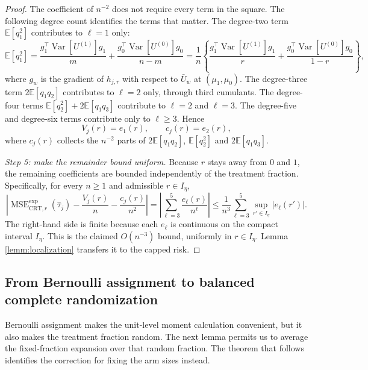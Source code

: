 \documentclass{article}
\newcommand{\EEE}{\mathbb{E}}
\newcommand{\Var}[1]{\operatorname{Var}\left[#1\right]}
\newcommand{\htau}{\hat{\tau}}
\DeclareMathOperator{\MSE}{MSE}
\newcommand{\CRT}{\mathrm{CRT}}
\newcommand{\MSEexp}{\MSE^{\mathrm{exp}}}
\theoremstyle{plain}
\theoremstyle{definition}
\theoremstyle{remark}
\begin{document}
\begin{proof}
The coefficient of $n^{-2}$ does not require every term in the square.
The following degree count identifies the terms that matter. The degree-two term $\EEE[q_1^2]$ contributes to $\ell=1$ only:
\[
\EEE[q_1^2]
=\frac{g_1^\top\Var{U^{(1)}}g_1}{m}+\frac{g_0^\top\Var{U^{(0)}}g_0}{n-m}
=\frac1n\left\{\frac{g_1^\top\Var{U^{(1)}}g_1}{r}+\frac{g_0^\top\Var{U^{(0)}}g_0}{1-r}\right\},
\]
where $g_w$ is the gradient of $h_{j,r}$ with respect to $\bar U_w$ at $(\mu_1,\mu_0)$. The degree-three term $2\EEE[q_1q_2]$ contributes to $\ell=2$ only, through third cumulants. The degree-four terms $\EEE[q_2^2]+2\EEE[q_1q_3]$ contribute to $\ell=2$ and $\ell=3$. The degree-five and degree-six terms contribute only to $\ell\ge3$. Hence
\[
V_j(r)=e_1(r),\qquad c_j(r)=e_2(r),
\]
where $c_j(r)$ collects the $n^{-2}$ parts of $2\EEE[q_1q_2]$, $\EEE[q_2^2]$ and $2\EEE[q_1q_3]$.

\emph{Step 5: make the remainder bound uniform.}
Because $r$ stays away from $0$ and $1$, the remaining coefficients
are bounded independently of the treatment fraction. Specifically,
for every $n\ge1$ and admissible $r\in I_\eta$,
\[
\left|\MSEexp_{\CRT,r}(\htau_j)-\frac{V_j(r)}{n}-\frac{c_j(r)}{n^2}\right|
=\left|\sum_{\ell=3}^{5}\frac{e_\ell(r)}{n^{\ell}}\right|
\le\frac{1}{n^{3}}\sum_{\ell=3}^{5}\sup_{r'\in I_\eta}|e_\ell(r')|.
\]
The right-hand side is finite because each $e_\ell$ is continuous on the compact interval $I_\eta$. This is the claimed $O(n^{-3})$ bound, uniformly in $r\in I_\eta$. Lemma \ref{lemm:localization} transfers it to the capped risk.
\end{proof}

\subsection{From Bernoulli assignment to balanced complete randomization}

Bernoulli assignment makes the unit-level moment calculation convenient,
but it also makes the treatment fraction random. The next lemma permits
us to average the fixed-fraction expansion over that random fraction.
The theorem that follows identifies the correction for fixing the arm
sizes instead.
\end{document}
